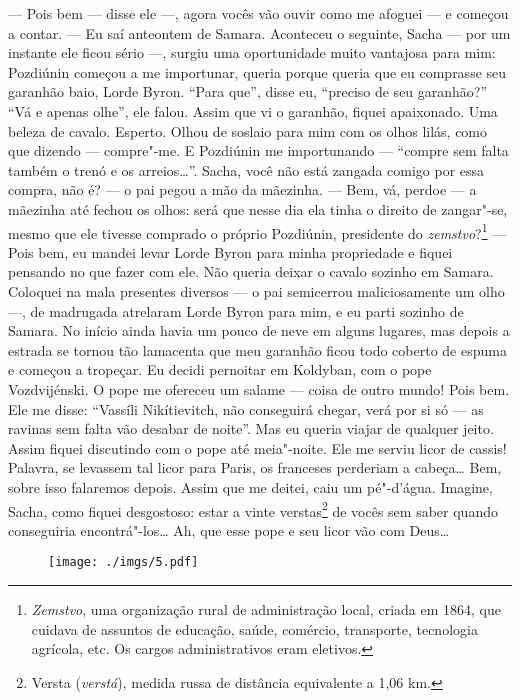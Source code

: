 --- Pois bem --- disse ele ---, agora vocês vão ouvir como me afoguei
--- e começou a contar. --- Eu saí anteontem de Samara. Aconteceu o
seguinte, Sacha --- por um instante ele ficou sério ---, surgiu uma
oportunidade muito vantajosa para mim: Pozdiúnin começou a me
importunar, queria porque queria que eu comprasse seu garanhão baio,
Lorde Byron. ``Para que'', disse eu, ``preciso de seu garanhão?'' ``Vá e
apenas olhe'', ele falou. Assim que vi o garanhão, fiquei apaixonado.
Uma beleza de cavalo. Esperto. Olhou de soslaio para mim com os olhos
lilás, como que dizendo --- compre"-me. E Pozdiúnin me importunando ---
``compre sem falta também o trenó e os arreios\ldots{}''. Sacha, você não
está zangada comigo por essa compra, não é? --- o pai pegou a mão da
mãezinha. --- Bem, vá, perdoe --- a mãezinha até fechou os olhos: será
que nesse dia ela tinha o direito de zangar"-se, mesmo que ele tivesse
comprado o próprio Pozdiúnin, presidente do \emph{zemstvo}?\footnote{\emph{Zemstvo},
  uma organização rural de administração local, criada em 1864, que
  cuidava de assuntos de educação, saúde, comércio, transporte,
  tecnologia agrícola, etc. Os cargos administrativos eram eletivos.}
--- Pois bem, eu mandei levar Lorde Byron para minha propriedade e
fiquei pensando no que fazer com ele. Não queria deixar o cavalo sozinho
em Samara. Coloquei na mala presentes diversos --- o pai semicerrou
maliciosamente um olho ---, de madrugada atrelaram Lorde Byron para mim,
e eu parti sozinho de Samara. No início ainda havia um pouco de neve em
alguns lugares, mas depois a estrada se tornou tão lamacenta que meu
garanhão ficou todo coberto de espuma e começou a tropeçar. Eu decidi
pernoitar em Koldyban, com o pope Vozdvijénski. O pope me ofereceu um
salame --- coisa de outro mundo! Pois bem. Ele me disse: ``Vassíli
Nikítievitch, não conseguirá chegar, verá por si só --- as ravinas sem
falta vão desabar de noite''. Mas eu queria viajar de qualquer jeito.
Assim fiquei discutindo com o pope até meia"-noite. Ele me serviu licor
de cassis! Palavra, se levassem tal licor para Paris, os franceses
perderiam a cabeça\ldots{} Bem, sobre isso falaremos depois. Assim que me
deitei, caiu um pé"-d'água. Imagine, Sacha, como fiquei desgostoso: estar
a vinte verstas\footnote{Versta (\emph{verstá}), medida russa de
  distância equivalente a 1,06 km.} de vocês sem saber quando
conseguiria encontrá"-los\ldots{} Ah, que esse pope e seu licor vão com
Deus\ldots{}

\begin{figure}
\vspace*{-2.1cm}
\hspace*{-2.5cm}\texttt{[image: ./imgs/5.pdf]}
\end{figure}

